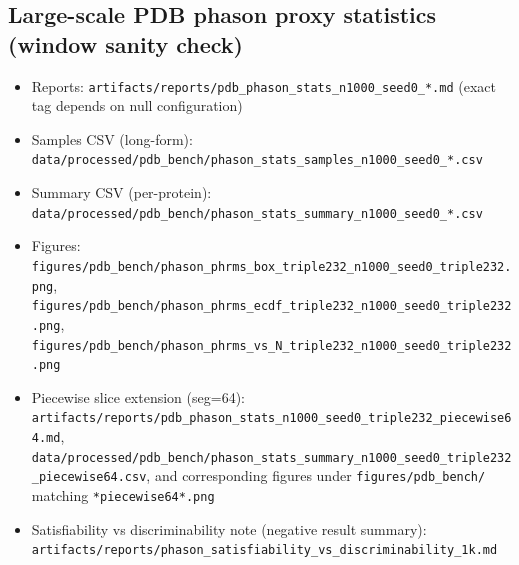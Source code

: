 \subsection*{Large-scale PDB phason proxy statistics (window sanity check)}
\begin{itemize}
  \item Reports: \texttt{artifacts/reports/pdb\_phason\_stats\_n1000\_seed0\_*.md} (exact tag depends on null configuration)
  \item Samples CSV (long-form): \texttt{data/processed/pdb\_bench/phason\_stats\_samples\_n1000\_seed0\_*.csv}
  \item Summary CSV (per-protein): \texttt{data/processed/pdb\_bench/phason\_stats\_summary\_n1000\_seed0\_*.csv}
  \item Figures: \texttt{figures/pdb\_bench/phason\_phrms\_box\_triple232\_n1000\_seed0\_triple232.png}, \texttt{figures/pdb\_bench/phason\_phrms\_ecdf\_triple232\_n1000\_seed0\_triple232.png}, \texttt{figures/pdb\_bench/phason\_phrms\_vs\_N\_triple232\_n1000\_seed0\_triple232.png}
  \item Piecewise slice extension (seg=64): \texttt{artifacts/reports/pdb\_phason\_stats\_n1000\_seed0\_triple232\_piecewise64.md}, \texttt{data/processed/pdb\_bench/phason\_stats\_summary\_n1000\_seed0\_triple232\_piecewise64.csv}, and corresponding figures under \texttt{figures/pdb\_bench/} matching \texttt{*piecewise64*.png}
  \item Satisfiability vs discriminability note (negative result summary): \texttt{artifacts/reports/phason\_satisfiability\_vs\_discriminability\_1k.md}
\end{itemize}

